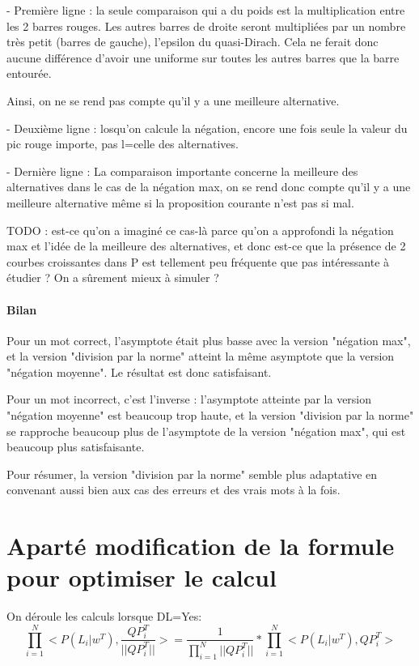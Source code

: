 \documentclass{article}
\begin{document}
- Première ligne : la seule comparaison qui a du poids est la multiplication entre les 2 barres rouges. Les autres barres de droite seront multipliées par un nombre très petit (barres de gauche), l'epsilon du quasi-Dirach. Cela ne ferait donc aucune différence d'avoir une uniforme sur toutes les autres barres que la barre entourée.

Ainsi, on ne se rend pas compte qu'il y a une meilleure alternative.

- Deuxième ligne : losqu'on calcule la négation, encore une fois seule la valeur du pic rouge importe, pas l=celle des alternatives.

- Dernière ligne : La comparaison importante concerne la meilleure des alternatives dans le cas de la négation max, on se rend donc compte qu'il y a une meilleure alternative même si la proposition courante n'est pas si mal.

TODO : est-ce qu'on a imaginé ce cas-là parce qu'on a approfondi la négation max et l'idée de la meilleure des alternatives, et donc est-ce que la présence de 2 courbes croissantes dans P est tellement peu fréquente que pas intéressante à étudier ?
On a sûrement mieux à simuler ? 
    
\paragraph{Bilan}

Pour un mot correct, l'asymptote était plus basse avec la version "négation max", et la version "division par la norme" atteint la même asymptote que la version "négation moyenne". Le résultat est donc satisfaisant.

Pour un mot incorrect, c'est l'inverse : l'asymptote atteinte par la version "négation moyenne" est beaucoup trop haute, et la version "division par la norme" se rapproche beaucoup plus de l'asymptote de la version "négation max", qui est beaucoup plus satisfaisante.

Pour résumer, la version "division par la norme" semble plus adaptative en convenant aussi bien aux cas des erreurs et des vrais mots à la fois.

\section{Aparté modification de la formule pour optimiser le calcul}
 
 On déroule les calculs lorsque DL=Yes:
  $$ \prod_{i=1}^{N} <P(L_i|w^T),\frac{QP_i^T}{||QP_i^T||}> = \frac{1}{\prod_{i=1}^{N} ||QP_i^T||} * \prod_{i=1}^{N} <P(L_i|w^T),QP_i^T> $$
  
\end{document}
